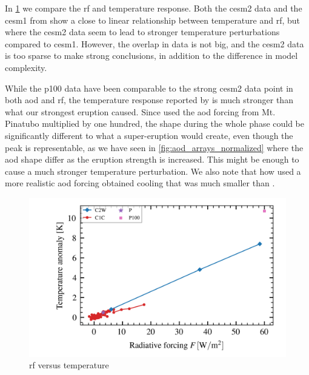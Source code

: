 \documentclass{ametsocV5}
\begin{document}
In \cref{fig:toa_vs_temp} we compare the \acrshort{rf} and temperature response. Both
the \acrshort{cesm2} data and the \acrshort{cesm1} from \citet{ottobliesner2016} show a
close to linear relationship between temperature and \acrshort{rf}, but where the
\acrshort{cesm2} data seem to lead to stronger temperature perturbations compared to
\acrshort{cesm1}. However, the overlap in data is not big, and the \acrshort{cesm2} data
is too sparse to make strong conclusions, in addition to the difference in model
complexity.

While the \acrshort{p100} data have been comparable to the strong \acrshort{cesm2} data
point in both \acrshort{aod} and \acrshort{rf}, the temperature response reported by
\citet{jones2005} is much stronger than what our strongest eruption caused. Since
\citet{jones2005} used the \acrshort{aod} forcing from Mt. Pinatubo multiplied by one
hundred, the shape during the whole phase could be significantly different to what a
super-eruption would create, even though the peak is representable, as we have seen in
\cref{fig:aod_arrays_normalized} where the \acrshort{aod} shape differ as the eruption
strength is increased. This might be enough to cause a much stronger temperature
perturbation. We also note that \citet{timmreck2010} how used a more realistic
\acrshort{aod} forcing obtained cooling that was much smaller
than \citet{jones2005}.

\begin{figure}[t]
  \begin{center}
    \includegraphics[width=0.95\linewidth]{figures/toa_vs_temperature.png}
  \end{center}
  \caption{\acrshort{rf} versus temperature}%
  \label{fig:toa_vs_temp}
\end{figure}
\end{document}
